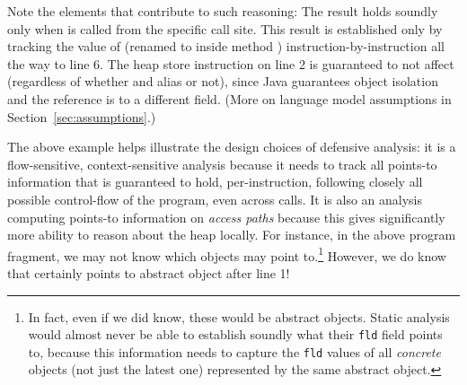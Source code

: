 Note the elements that contribute to such reasoning: The result holds
soundly only when  is called from the specific call site. This
result is established only by tracking the value of 
(renamed to  inside method )
instruction-by-instruction all the way to line 6. The heap store
instruction on line 2 is guaranteed to not affect  (regardless
of whether  and  alias or not), since
Java guarantees object isolation and the reference is to a different
field. (More on language model assumptions in
Section~\ref{sec:assumptions}.)

The above example helps illustrate the design choices of defensive
analysis: it is a flow-sensitive, context-sensitive analysis because
it needs to track all points-to information that is guaranteed to
hold, per-instruction, following closely all possible control-flow of
the program, even across calls. It is also an analysis computing
points-to information on \emph{access paths} because this gives
significantly more ability to reason about the heap locally.  For
instance, in the above program fragment, we may not know which objects
 may point to.\footnote{In fact, even if we did know, these
  would be abstract objects.  Static analysis would almost never be
  able to establish soundly what their \texttt{fld} field points to,
  because this information needs to capture the \texttt{fld} values of
  all \emph{concrete} objects (not just the latest one)
  represented by the same abstract object.}
%
%
However, we do know that  certainly points to abstract
object  after line 1!






